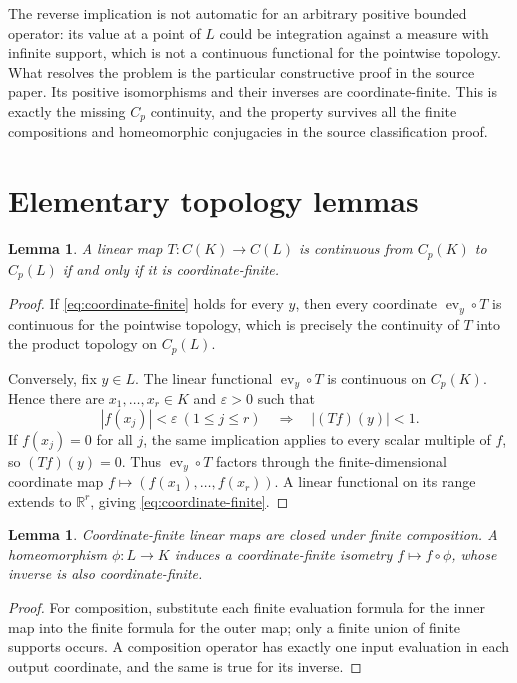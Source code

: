 \documentclass[11pt]{article}
\newtheorem{lemma}[theorem]{Lemma}
\newcommand{\C}{C}
\newcommand{\Cp}{C_p}
\newcommand{\R}{\mathbb R}
\newcommand{\ev}{\operatorname{ev}}
\begin{document}
The reverse implication is not automatic for an arbitrary positive bounded
operator: its value at a point of $L$ could be integration against a measure
with infinite support, which is not a continuous functional for the pointwise
topology.  What resolves the problem is the particular constructive proof in
the source paper.  Its positive isomorphisms and their inverses are
coordinate-finite.  This is exactly the missing $C_p$ continuity, and the
property survives all the finite compositions and homeomorphic conjugacies in
the source classification proof.

\section{Elementary topology lemmas}
\begin{lemma}\label{lem:cp}
A linear map $T:\C(K)\to\C(L)$ is continuous from $\Cp(K)$ to $\Cp(L)$ if
and only if it is coordinate-finite.
\end{lemma}
\begin{proof}
If \eqref{eq:coordinate-finite} holds for every $y$, then every coordinate
$\ev_y\circ T$ is continuous for the pointwise topology, which is precisely
the continuity of $T$ into the product topology on $\Cp(L)$.

Conversely, fix $y\in L$.  The linear functional $\ev_y\circ T$ is continuous
on $\Cp(K)$.  Hence there are $x_1,\ldots,x_r\in K$ and $\varepsilon>0$ such
that
\[
 |f(x_j)|<\varepsilon\ (1\leq j\leq r)
 \quad\Longrightarrow\quad |(Tf)(y)|<1.
\]
If $f(x_j)=0$ for all $j$, the same implication applies to every scalar
multiple of $f$, so $(Tf)(y)=0$.  Thus $\ev_y\circ T$ factors through the
finite-dimensional coordinate map
$f\mapsto(f(x_1),\ldots,f(x_r))$.  A linear functional on its range extends
to $\R^r$, giving \eqref{eq:coordinate-finite}.
\end{proof}

\begin{lemma}\label{lem:composition}
Coordinate-finite linear maps are closed under finite composition.  A
homeomorphism $\phi:L\to K$ induces a coordinate-finite isometry
$f\mapsto f\circ\phi$, whose inverse is also coordinate-finite.
\end{lemma}
\begin{proof}
For composition, substitute each finite evaluation formula for the inner map
into the finite formula for the outer map; only a finite union of finite
supports occurs.  A composition operator has exactly one input evaluation in
each output coordinate, and the same is true for its inverse.
\end{proof}
\end{document}
